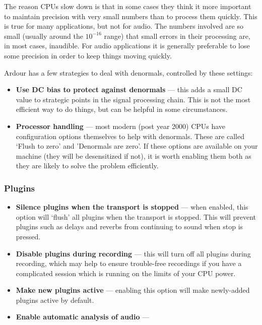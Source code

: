 \documentclass[10pt,a4paper]{book}
\newcommand{\todo}[1]{\marginpar{\small\texttt{#1}}}
\begin{document}
\begin{danger}
The reason CPUs slow down is that in some cases they think it more
important to maintain precision with very small numbers than to
process them quickly.  This is true for many applications, but not for
audio.  The numbers involved are so small (usually around the
$10^{-16}$ range) that small errors in their processing are, in most
cases, inaudible.  For audio applications it is generally preferable
to lose some precision in order to keep things moving quickly.
\end{danger}

Ardour has a few strategies to deal with denormals, controlled by
these settings:

\begin{itemize}
\item \textbf{Use DC bias to protect against denormals} --- this adds a
small DC value to strategic points in the signal processing chain.
This is not the most efficient way to do things, but can be helpful in
some circumstances.
\item \textbf{Processor handling} --- most modern (post
year 2000) CPUs have configuration options themselves to help with
denormals.  These are called `Flush to zero' and 'Denormals are zero'.
If these options are available on your machine (they will be
desensitized if not), it is worth enabling them both as they are
likely to solve the problem efficiently.
\end{itemize}

\subsubsection{Plugins}

\begin{itemize}
\item \textbf{Silence plugins when the transport is stopped} --- when
  enabled, this option will `flush' all plugins when the transport is
  stopped.  This will prevent plugins such as delays and reverbs from
  continuing to sound when stop is pressed.
\item \textbf{Disable plugins during recording} --- this will turn off
  all plugins during recording, which may help to ensure trouble-free
  recordings if you have a complicated session which is running on the
  limits of your CPU power.
\item \textbf{Make new plugins active} --- enabling this option will
  make newly-added plugins active by default.
\item \textbf{Enable automatic analysis of audio} --- \todo{think this
  should be reworked}
\end{itemize}
\end{document}

